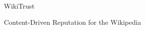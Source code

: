 \vspace*{\fill}
\begin{center}
\HUGE\textsf{WikiTrust}\par
\end{center}
\begin{center}
\LARGE\textsf{Content-Driven Reputation for the Wikipedia}\par
\end{center}
\vspace*{\fill}

